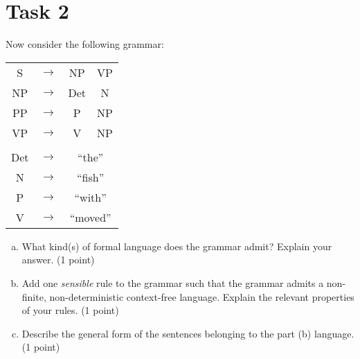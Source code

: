 \documentclass[paper=a4, fontsize=11pt]{scrartcl} %
\numberwithin{equation}{section} %
\numberwithin{figure}{section} %
\numberwithin{table}{section} %
\begin{document}
\newpage

\section*{Task 2}

Now consider the following grammar:

\begin{table}[h!]
\begin{center}
\begin{tabular}{c c c c}
S  & $\rightarrow$ & NP  & VP\\
NP & $\rightarrow$ & Det & N \\
PP & $\rightarrow$ & P   & NP\\
VP & $\rightarrow$ & V   & NP\\
   &               &     &   \\
Det & $\rightarrow$ & \multicolumn{2}{c}{``the''}\\
N   & $\rightarrow$ & \multicolumn{2}{c}{``fish''}\\
P   & $\rightarrow$ & \multicolumn{2}{c}{``with''}\\
V   & $\rightarrow$ & \multicolumn{2}{c}{``moved''}\\
\end{tabular}
\end{center}
\end{table}

\begin{enumerate}[a.]
\item What kind(s) of formal language does the grammar admit? Explain your answer. (1 point)
\item Add one \textit{sensible} rule to the grammar such that the grammar admits a non-finite, non-deterministic context-free language. Explain the relevant properties of your rules. (1 point)
\item Describe the general form of the sentences belonging to the part (b) language. (1 point)
\end{enumerate}
\end{document}
